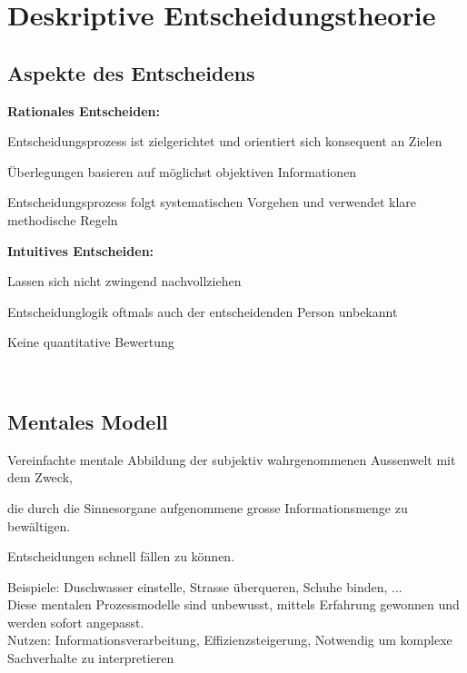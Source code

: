 \section{Deskriptive Entscheidungstheorie}
\subsection{Aspekte des Entscheidens}
\begin{multicols}{2}
	\textbf{Rationales Entscheiden:} 
	\begin{compactitem}
		\item Entscheidungsprozess ist zielgerichtet und orientiert sich konsequent an Zielen
		\item Überlegungen basieren auf möglichst objektiven Informationen
		\item Entscheidungsprozess folgt systematischen Vorgehen und verwendet klare methodische Regeln
	\end{compactitem}

	\textbf{Intuitives Entscheiden:} 
	\begin{compactitem}
		\item Lassen sich nicht zwingend nachvollziehen
		\item Entscheidunglogik oftmals auch der entscheidenden Person unbekannt
		\item Keine quantitative Bewertung
	\end{compactitem} \ \\
\end{multicols}

\subsection{Mentales Modell}
Vereinfachte mentale Abbildung der subjektiv wahrgenommenen Aussenwelt mit dem Zweck,
\begin{compactitem}
	\item die durch die Sinnesorgane aufgenommene grosse Informationsmenge zu bewältigen.
	\item Entscheidungen schnell fällen zu können.
\end{compactitem}
Beispiele: Duschwasser einstelle, Strasse überqueren, Schuhe binden, ... \\
Diese mentalen Prozessmodelle sind unbewusst, mittels Erfahrung gewonnen und werden sofort angepasst. \\
Nutzen: Informationsverarbeitung, Effizienzsteigerung, Notwendig um komplexe Sachverhalte zu interpretieren

